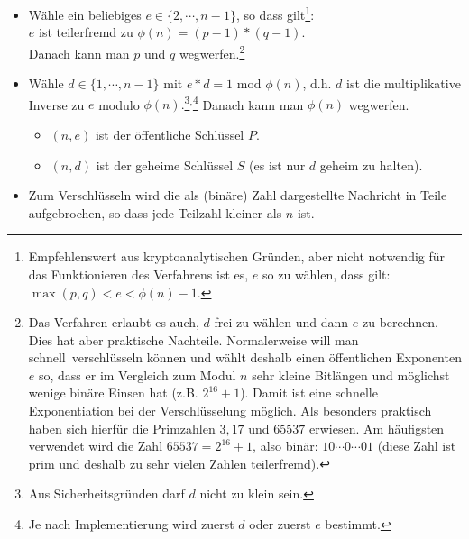 \begin{refsegment}
\begin{itemize}
\item[{\bf 2.}] Wähle ein beliebiges $e \in \{2, \cdots, n-1\}$, so dass
                gilt\footnote{%
                \label{foot:Selection-of-e}%
                Empfehlenswert aus kryptoanalytischen Gründen, aber nicht
                notwendig für das Funktionieren des Verfahrens ist es, $e$ so
                zu wählen, dass gilt:
                $\max(p,q) < e < \phi(n) - 1$.}:\\
                $e$ ist teilerfremd
                zu $\phi(n) = (p-1)*(q-1)$.\\
                Danach kann man $p$ und $q$ \glqq wegwerfen\grqq.\footnote{%
                Das Verfahren erlaubt es auch, $d$ frei zu wählen und dann
                $e$ zu berechnen.
                Dies hat aber praktische Nachteile.
                Normalerweise will man \glqq schnell\grqq~verschlüsseln können
                und wählt deshalb einen öffentlichen Exponenten $e$ so, dass
                er im Vergleich zum Modul $n$ sehr kleine Bitlängen und
                möglichst wenige binäre Einsen hat (z.B. $2^{16} + 1$).
                Damit ist eine schnelle Exponentiation bei der
                Verschlüsselung möglich.
                Als besonders praktisch haben sich hierfür die
                Primzahlen $3, 17$ und $65537$ erwiesen.
                Am häufigsten verwendet wird die Zahl $65537 = 2^{16}+1$,
                also binär: $10\cdots 0\cdots 01$ (diese Zahl ist prim und
                deshalb zu sehr vielen Zahlen teilerfremd).
                }
\item[{\bf 3.}] Wähle $d \in \{1, \cdots, n-1\}$  mit  $e*d = 1$  mod $\phi(n)$,
      d.h. $d$ ist die multiplikative Inverse zu $e$ modulo $\phi(n).$\footnote{%
      Aus Sicherheitsgründen darf $d$ nicht zu klein sein.
      }$^,$\footnote{%
      Je nach Implementierung wird zuerst $d$ oder zuerst $e$ bestimmt.
      } Danach kann man $\phi(n)$ \glqq wegwerfen\grqq.
  \begin{itemize}
      \item[$\rightarrow$] $(n, e)$ ist der öffentliche Schlüssel $P$.
      \item[$\rightarrow$] $(n, d)$ ist der geheime Schlüssel $S$ (es
            ist nur $d$ geheim zu halten).
  \end{itemize}
\item[{\bf 4.}] Zum Verschlüsseln wird die als (binäre) Zahl dargestellte Nachricht in Teile
                aufgebrochen, so dass jede Teilzahl kleiner als $n$ ist.

\end{itemize}
\end{refsegment}
